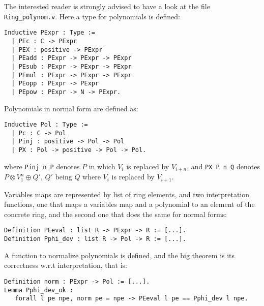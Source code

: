 The interested reader is strongly advised to have a look at the file
\texttt{Ring\_polynom.v}. Here a type for polynomials is defined:

\begin{small}
\begin{flushleft}
\begin{verbatim}
Inductive PExpr : Type :=
  | PEc : C -> PExpr
  | PEX : positive -> PExpr
  | PEadd : PExpr -> PExpr -> PExpr
  | PEsub : PExpr -> PExpr -> PExpr
  | PEmul : PExpr -> PExpr -> PExpr
  | PEopp : PExpr -> PExpr
  | PEpow : PExpr -> N -> PExpr.
\end{verbatim}
\end{flushleft}
\end{small}

Polynomials in normal form are defined as:
\begin{small}
\begin{flushleft}
\begin{verbatim}
Inductive Pol : Type :=
  | Pc : C -> Pol
  | Pinj : positive -> Pol -> Pol
  | PX : Pol -> positive -> Pol -> Pol.
\end{verbatim}
\end{flushleft}
\end{small}
where {\tt Pinj n P} denotes $P$ in which $V_i$ is replaced by
$V_{i+n}$, and {\tt PX P n Q} denotes $P \otimes V_1^{n} \oplus Q'$,
$Q'$ being $Q$ where $V_i$ is replaced by $V_{i+1}$.


Variables maps are represented by list of ring elements, and two
interpretation functions, one that maps a variables map and a
polynomial to an element of the concrete ring, and the second one that
does the same for normal forms:
\begin{small}
\begin{flushleft}
\begin{verbatim}
Definition PEeval : list R -> PExpr -> R := [...].
Definition Pphi_dev : list R -> Pol -> R := [...].
\end{verbatim}
\end{flushleft}
\end{small}

A function to normalize polynomials is defined, and the big theorem is
its correctness w.r.t interpretation, that is:

\begin{small}
\begin{flushleft}
\begin{verbatim}
Definition norm : PExpr -> Pol := [...].
Lemma Pphi_dev_ok :
   forall l pe npe, norm pe = npe -> PEeval l pe == Pphi_dev l npe.
\end{verbatim}
\end{flushleft}
\end{small}

